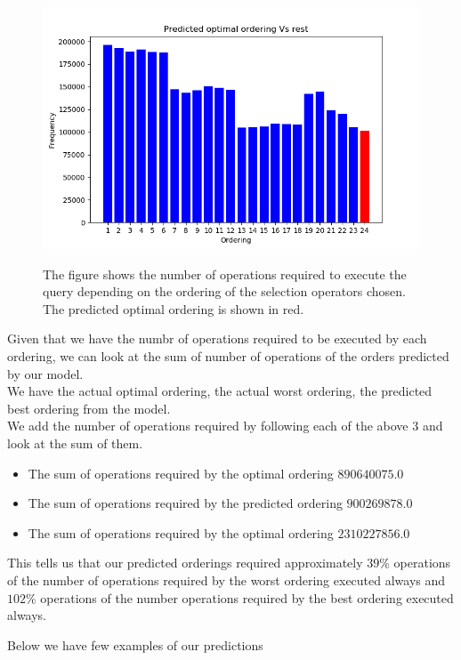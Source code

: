 \begin{figure}
\centering
\includegraphics[scale=0.8]{operations2.png}\\
\caption{The figure shows the number of operations required to execute the query depending on the ordering of the selection operators chosen. The predicted optimal ordering is shown in red.}
\label{fig:operations2}
\end{figure}

\par Given that we have the numbr of operations required to be executed by each ordering, we can look at the sum of number of operations of the orders predicted by our model.\\ 
We have the actual optimal ordering, the actual worst ordering, the predicted best ordering from the model.\\
We add the number of operations required by following each of the above $3$ and look at the sum of them.\\
\begin{itemize}
    \item The sum of operations required by the optimal ordering $890640075.0$
    \item The sum of operations required by the predicted ordering $900269878.0$
    \item The sum of operations required by the optimal ordering $2310227856.0$
\end{itemize}
This tells us that our predicted orderings required approximately $39\%$ operations of the number of operations required by the worst ordering executed always and $102\%$ operations of the number operations required by the best ordering executed always.\\
\par Below we have few examples of our predictions

